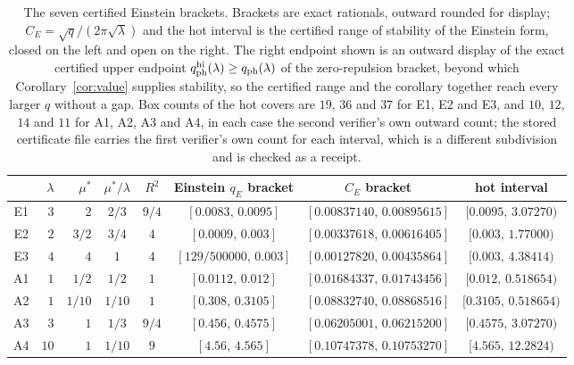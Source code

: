 \documentclass[11pt]{article}
\newcommand{\muS}{\mu^{*}}
\theoremstyle{definition}
\theoremstyle{remark}
\begin{document}
\begin{table}[t]
\centering
\footnotesize
\setlength{\tabcolsep}{5pt}
\renewcommand{\arraystretch}{1.15}
\begin{tabular}{@{}crrccccc@{}}
\toprule
 & $\lambda$ & $\muS$ & $\muS/\lambda$ & $R^2$ & Einstein $q_E$ bracket & $C_E$ bracket & hot interval\\
\midrule
E1 & $3$ & $2$ & $2/3$ & $9/4$ & $[0.0083,\,0.0095]$ & $[0.00837140,\,0.00895615]$ & $[0.0095,\,3.07270)$\\
E2 & $2$ & $3/2$ & $3/4$ & $4$ & $[0.0009,\,0.003]$ & $[0.00337618,\,0.00616405]$ & $[0.003,\,1.77000)$\\
E3 & $4$ & $4$ & $1$ & $4$ & $[129/500000,\,0.003]$ & $[0.00127820,\,0.00435864]$ & $[0.003,\,4.38414)$\\
A1 & $1$ & $1/2$ & $1/2$ & $1$ & $[0.0112,\,0.012]$ & $[0.01684337,\,0.01743456]$ & $[0.012,\,0.518654)$\\
A2 & $1$ & $1/10$ & $1/10$ & $1$ & $[0.308,\,0.3105]$ & $[0.08832740,\,0.08868516]$ & $[0.3105,\,0.518654)$\\
A3 & $3$ & $1$ & $1/3$ & $9/4$ & $[0.456,\,0.4575]$ & $[0.06205001,\,0.06215200]$ & $[0.4575,\,3.07270)$\\
A4 & $10$ & $1$ & $1/10$ & $9$ & $[4.56,\,4.565]$ & $[0.10747378,\,0.10753270]$ & $[4.565,\,12.2824)$\\
\bottomrule
\end{tabular}
\caption{The seven certified Einstein brackets. Brackets are exact rationals, outward
rounded for display; $C_E=\sqrt q/(2\pi\sqrt\lambda)$ and the hot interval is the certified
range of stability of the Einstein form, closed on the left and open on the right. The
right endpoint shown is an outward display of the exact certified upper endpoint
$q_{\rm ph}^{\rm hi}(\lambda)\ge q_{\rm ph}(\lambda)$ of the zero-repulsion bracket, beyond
which Corollary~\ref{cor:value} supplies stability, so the certified range and the
corollary together reach every larger $q$ without a gap. Box counts of the hot covers are
$19$, $36$ and $37$ for E1, E2 and E3, and $10$, $12$, $14$ and $11$ for A1, A2, A3 and
A4, in each case the second verifier's own outward count; the stored certificate file carries the first verifier's own count for each
interval, which is a different subdivision and is checked as a receipt.}
\label{tab:brackets}
\end{table}
\end{document}

